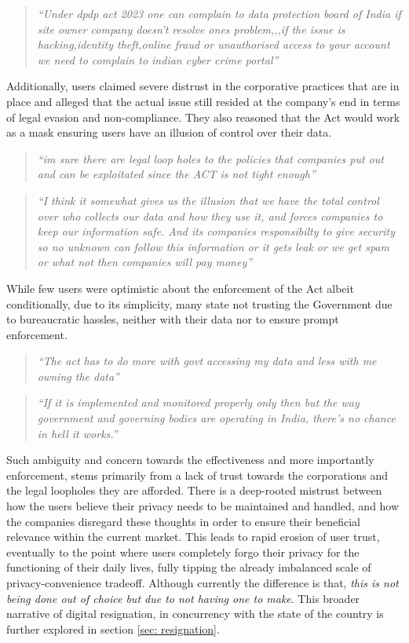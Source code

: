 \begin{quote}
    \textit{``Under dpdp act 2023 one can complain to data protection board of India if site owner company doesn't resolve ones problem,,,if the issue is hacking,identity theft,online fraud or unauthorised access to your account we need to complain to indian cyber crime portal''}
\end{quote}

Additionally, users claimed severe distrust in the corporative practices that are in place and alleged that the actual issue still resided at the company's end in terms of legal evasion and non-compliance. They also reasoned that the Act would work as a mask ensuring users have an illusion of control over their data.

\begin{quote}
    \textit{``im sure there are legal loop holes to the policies that companies put out and can be exploitated since the ACT is not tight enough''}
\end{quote}

\begin{quote}
    \textit{``I think it somewhat gives us the illusion that we have the total control over who collects our data and how they use it, and forces companies to keep our information safe. And its companies responsibilty to give security so no unknown can follow this information or it gets leak or we get spam or what not then companies will pay money''}
\end{quote}

While few users were optimistic about the enforcement of the Act albeit conditionally, due to its simplicity, many state not trusting the Government due to bureaucratic hassles, neither with their data nor to ensure prompt enforcement. 

\begin{quote}
    \textit{``The act has to do more with govt accessing my data and less with me owning the data''}
\end{quote}
\begin{quote}
    \textit{``If it is implemented and monitored properly only then but the way government and governing bodies are operating in India, there's no chance in hell it works.''}
\end{quote}

Such ambiguity and concern towards the effectiveness and more importantly enforcement, stems primarily from a lack of trust towards the corporations and the legal loopholes they are afforded. There is a deep-rooted mistrust between how the users believe their privacy needs to be maintained and handled, and how the companies disregard these thoughts in order to ensure their beneficial relevance within the current market. This leads to rapid erosion of user trust, eventually to the point where users completely forgo their privacy for the functioning of their daily lives, fully tipping the already imbalanced scale of privacy-convenience tradeoff. Although currently the difference is that, \textit{this is not being done out of choice but due to not having one to make}. This broader narrative of digital resignation, in concurrency with the state of the country is further explored in section \ref{sec: resignation}. 

